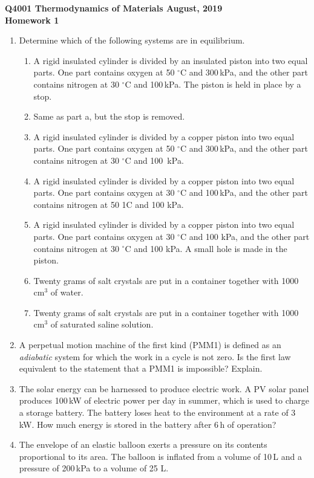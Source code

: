 \documentclass[11pt]{article} %
\newcommand{\degree}{$^\circ$}
\begin{document}
{\bfseries \noindent Q4001 Thermodynamics of Materials \hfill August, 2019\\
Homework 1\\
}
\begin{enumerate}
\item Determine which of the following systems are in equilibrium.
\begin{enumerate} 
\item A rigid insulated cylinder is divided by an insulated piston into two equal parts. One part contains oxygen at 50 \degree C and 300\,kPa, and the other part contains nitrogen at 30 \degree C and 100\,kPa. The piston is held in place by a stop.
\item Same as part a, but the stop is removed.
\item A rigid insulated cylinder is divided by a copper piston into two equal parts.
One part contains oxygen at 50 \degree C and 300\,kPa, and the other part contains nitrogen at 30 \degree C and 100 \,kPa.
\item A rigid insulated cylinder is divided by a copper piston into two equal parts. One part contains oxygen at 30 \degree C and 100\,kPa, and the other part contains nitrogen at 50 1C and 100 kPa.
\item A rigid insulated cylinder is divided by a copper piston into two equal parts. One part contains oxygen at 30 \degree C and 100 kPa, and the other part contains nitrogen at 30 \degree C and 100 kPa. A small hole is made in the piston.
\item Twenty grams of salt crystals are put in a container together with 1000 cm$^3$ of water.
\item Twenty grams of salt crystals are put in a container together with 1000 cm$^3$ of saturated saline solution.
\end{enumerate}
\item A perpetual motion machine of the first kind (PMM1) is defined as an {\em adiabatic} system for which the work in a cycle is not zero. Is the first law equivalent to the statement that a PMM1 is impossible? Explain.
\item The solar energy can be harnessed to produce electric work. A PV solar panel produces 100\,kW of electric power per day in summer, which is used to charge a storage battery. The battery loses heat to the environment at a rate of 3\,kW. How much energy is stored in the battery after 6\,h of operation?
\item The envelope of an elastic balloon exerts a pressure on its contents proportional to its area. The balloon is inflated from a volume of 10\,L and a pressure of 200\,kPa to a volume of 25 L.

\end{enumerate}
\end{document}
